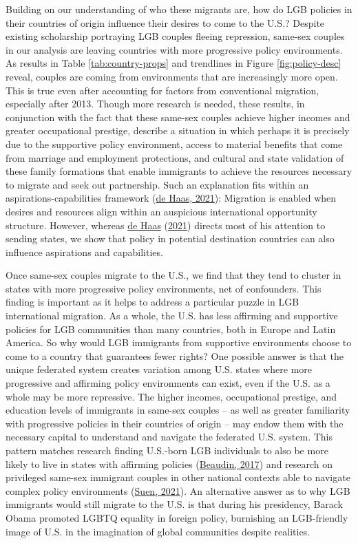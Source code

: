 \documentclass[
  12pt,
]{article}
\begin{document}
Building on our understanding of who these migrants are, how do LGB policies in their countries of origin influence their desires to come to the U.S.? Despite existing scholarship portraying LGB couples fleeing repression, same-sex couples in our analysis are leaving countries with more progressive policy environments. As results in Table \ref{tab:country-props} and trendlines in Figure \ref{fig:policy-desc} reveal, couples are coming from environments that are increasingly more open. This is true even after accounting for factors from conventional migration, especially after 2013. Though more research is needed, these results, in conjunction with the fact that these same-sex couples achieve higher incomes and greater occupational prestige, describe a situation in which perhaps it is precisely due to the supportive policy environment, access to material benefits that come from marriage and employment protections, and cultural and state validation of these family formations that enable immigrants to achieve the resources necessary to migrate and seek out partnership. Such an explanation fits within an aspirations-capabilities framework (\protect\hyperlink{ref-dehaas_2021}{de Haas, 2021}): Migration is enabled when desires and resources align within an auspicious international opportunity structure. However, whereas \protect\hyperlink{ref-dehaas_2021}{de Haas} (\protect\hyperlink{ref-dehaas_2021}{2021}) directs most of his attention to sending states, we show that policy in potential destination countries can also influence aspirations and capabilities.

Once same-sex couples migrate to the U.S., we find that they tend to cluster in states with more progressive policy environments, net of confounders. This finding is important as it helps to address a particular puzzle in LGB international migration. As a whole, the U.S. has less affirming and supportive policies for LGB communities than many countries, both in Europe and Latin America. So why would LGB immigrants from supportive environments choose to come to a country that guarantees fewer rights? One possible answer is that the unique federated system creates variation among U.S. states where more progressive and affirming policy environments can exist, even if the U.S. as a whole may be more repressive. The higher incomes, occupational prestige, and education levels of immigrants in same-sex couples -- as well as greater familiarity with progressive policies in their countries of origin -- may endow them with the necessary capital to understand and navigate the federated U.S. system. This pattern matches research finding U.S.-born LGB individuals to also be more likely to live in states with affirming policies (\protect\hyperlink{ref-beaudin_2017}{Beaudin, 2017}) and research on privileged same-sex immigrant couples in other national contexts able to navigate complex policy environments (\protect\hyperlink{ref-suen_2021_sexual}{Suen, 2021}). An alternative answer as to why LGB immigrants would still migrate to the U.S. is that during his presidency, Barack Obama promoted LGBTQ equality in foreign policy, burnishing an LGB-friendly image of U.S. in the imagination of global communities despite realities.
\end{document}
